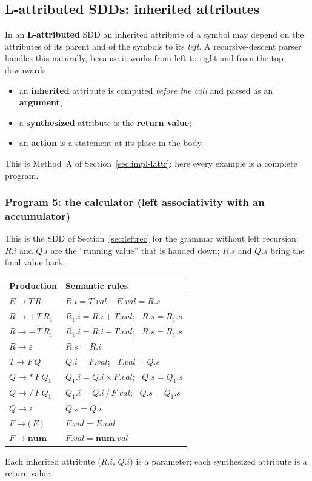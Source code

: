 \documentclass[11pt,a4paper]{article}
\newcommand{\at}[2]{\ensuremath{#1.\mathit{#2}}}
\newcommand{\tok}[1]{\ensuremath{\mathtt{#1}}}
\begin{document}
\subsection{L-attributed SDDs: inherited attributes}
\label{sec:rdlattr}

In an \textbf{L-attributed} SDD an inherited attribute of a symbol may depend on the attributes of its parent and of the symbols to its \emph{left}. A recursive-descent parser handles this naturally, because it works from left to right and from the top downwards:
\begin{itemize}[nosep]
\item an \textbf{inherited} attribute is computed \emph{before the call} and passed as an \textbf{argument};
\item a \textbf{synthesized} attribute is the \textbf{return value};
\item an \textbf{action} is a statement at its place in the body.
\end{itemize}
This is Method~A of Section~\ref{sec:impl-lattr}; here every example is a complete program.

\subsubsection*{Program 5: the calculator (left associativity with an accumulator)}
This is the SDD of Section~\ref{sec:leftrec} for the grammar without left recursion. $R.i$ and $Q.i$ are the ``running value'' that is handed down; $R.s$ and $Q.s$ bring the final value back.
\begin{center}
\small
\begin{tabular}{@{}l l@{}}
\toprule
\textbf{Production} & \textbf{Semantic rules} \\ \midrule
$E \to T\,R$ & $\at{R}{i}=\at{T}{val}$; \ $\at{E}{val}=\at{R}{s}$ \\
$R \to +\,T\,R_1$ & $\at{R_1}{i}=\at{R}{i}+\at{T}{val}$; \ $\at{R}{s}=\at{R_1}{s}$ \\
$R \to -\,T\,R_1$ & $\at{R_1}{i}=\at{R}{i}-\at{T}{val}$; \ $\at{R}{s}=\at{R_1}{s}$ \\
$R \to \varepsilon$ & $\at{R}{s}=\at{R}{i}$ \\
$T \to F\,Q$ & $\at{Q}{i}=\at{F}{val}$; \ $\at{T}{val}=\at{Q}{s}$ \\
$Q \to *\,F\,Q_1$ & $\at{Q_1}{i}=\at{Q}{i}\times\at{F}{val}$; \ $\at{Q}{s}=\at{Q_1}{s}$ \\
$Q \to /\,F\,Q_1$ & $\at{Q_1}{i}=\at{Q}{i}\,/\,\at{F}{val}$; \ $\at{Q}{s}=\at{Q_1}{s}$ \\
$Q \to \varepsilon$ & $\at{Q}{s}=\at{Q}{i}$ \\
$F \to \tok{(}\,E\,\tok{)}$ & $\at{F}{val}=\at{E}{val}$ \\
$F \to \mathbf{num}$ & $\at{F}{val}=\at{\mathbf{num}}{val}$ \\ \bottomrule
\end{tabular}
\end{center}
Each inherited attribute ($R.i$, $Q.i$) is a parameter; each synthesized attribute is a return value.
\end{document}
